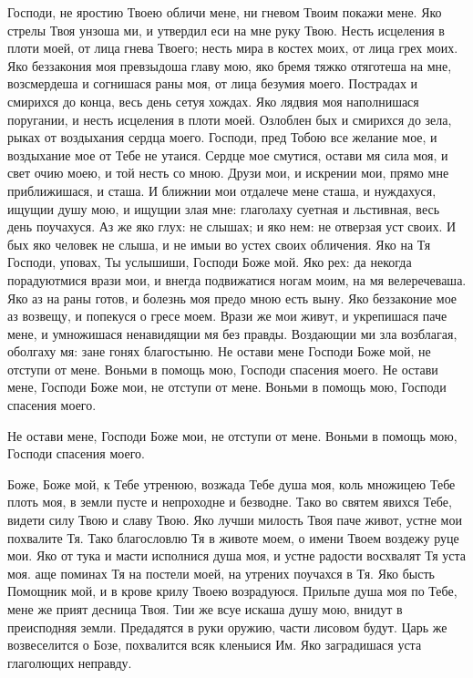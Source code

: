 \begin{mymulticols}
Господи, не яростию Твоею обличи мене, ни гневом Твоим покажи мене. Яко стрелы Твоя унзоша ми, и утвердил еси на мне руку Твою. Несть исцеления в плоти моей, от лица гнева Твоего; несть мира в костех моих, от лица грех моих. Яко беззакония моя превзыдоша главу мою, яко бремя тяжко отяготеша на мне, возсмердеша и согнишася раны моя, от лица безумия моего. Пострадах и смирихся до конца, весь день сетуя хождах. Яко лядвия моя наполнишася поругании, и несть исцеления в плоти моей. Озлоблен бых и смирихся до зела, рыках от воздыхания сердца моего. Господи, пред Тобою все желание мое, и воздыхание мое от Тебе не утаися. Сердце мое смутися, остави мя сила моя, и свет очию моею, и той несть со мною. Друзи мои, и искрении мои, прямо мне приближишася, и сташа. И ближнии мои отдалече мене сташа, и нуждахуся, ищущии душу мою, и ищущии злая мне: глаголаху суетная и льстивная, весь день поучахуся. Аз же яко глух: не слышах; и яко нем: не отверзая уст своих. И бых яко человек не слыша, и не имыи во устех своих обличения. Яко на Тя Господи, уповах, Ты услышиши, Господи Боже мой. Яко рех: да некогда порадуютмися врази мои, и внегда подвижатися ногам моим, на мя велеречеваша. Яко аз на раны готов, и болезнь моя предо мною есть выну. Яко беззаконие мое аз возвещу, и попекуся о гресе моем. Врази же мои живут, и укрепишася паче мене, и умножишася ненавидящии мя без правды. Воздающии ми зла возблагая, оболгаху мя: зане гонях благостыню. Не остави мене Господи Боже мой, не отступи от мене. Воньми в помощь мою, Господи спасения моего. Не остави мене, Господи Боже мои, не отступи от мене. Воньми в помощь мою, Господи спасения моего.

Не остави мене, Господи Боже мои, не отступи от мене. Воньми в помощь мою, Господи спасения моего.




Боже, Боже мой, к Тебе утренюю, возжада Тебе душа моя, коль множицею Тебе плоть моя, в земли пусте и непроходне и безводне. Тако во святем явихся Тебе, видети силу Твою и славу Твою. Яко лучши милость Твоя паче живот, устне мои похвалите Тя. Тако благословлю Тя в животе моем, о имени Твоем воздежу руце мои. Яко от тука и масти исполнися душа моя, и устне радости восхвалят Тя уста моя. аще поминах Тя на постели моей, на утрених поучахся в Тя. Яко бысть Помощник мой, и в крове крилу Твоею возрадуюся. Прильпе душа моя по Тебе, мене же прият десница Твоя. Тии же всуе искаша душу мою, внидут в преисподняя земли. Предадятся в руки оружию, части лисовом будут. Царь же возвеселится о Бозе, похвалится всяк кленыися Им. Яко заградишася уста глаголющих неправду.


\end{mymulticols}
